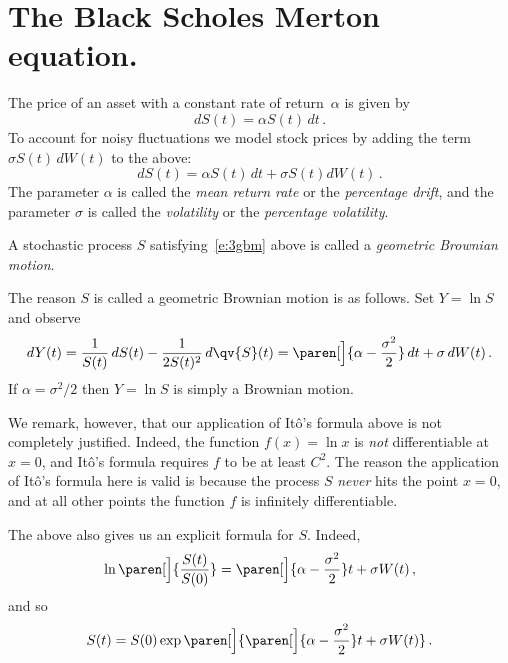 \section{The Black Scholes Merton equation.}

The price of an asset with a constant rate of return~$\alpha$ is given by
\begin{equation*}
  dS(t) = \alpha S(t) \, dt\,.
\end{equation*}
To account for noisy fluctuations we model stock prices by adding the term $\sigma S(t) \, dW(t)$ to the above:
\begin{equation}\label{e:3gbm}
  dS(t) = \alpha S(t) \, dt + \sigma S(t) dW(t)\,.
\end{equation}
The parameter $\alpha$ is called the \emph{mean return rate} or the \emph{percentage drift}, and the parameter $\sigma$ is called the \emph{volatility} or the \emph{percentage volatility}.

\begin{definition}
  A stochastic process $S$ satisfying~\eqref{e:3gbm} above is called a \emph{geometric Brownian motion}.
\end{definition}

The reason $S$ is called a geometric Brownian motion is as follows.
Set $Y = \ln S$ and observe
\begin{equation*}
  dY(t) = \frac{1}{S(t)} \, dS(t) - \frac{1}{2 S(t)^2} \, d\qv{S}(t)
    = \paren[\Big]{\alpha - \frac{\sigma^2}{2}} \, dt + \sigma \, dW(t)\,.
\end{equation*}
If $\alpha = \sigma^2/2$ then $Y = \ln S$ is simply a Brownian motion.

We remark, however, that our application of It\^o's formula above is not completely justified.
Indeed, the function $f(x) = \ln x$ is \emph{not} differentiable at $x = 0$, and It\^o's formula requires $f$ to be at least $C^2$.
The reason the application of It\^o's formula here is valid is because the process $S$ \emph{never} hits the point $x = 0$, and at all other points the function $f$ is infinitely differentiable.

The above also gives us an explicit formula for $S$.
Indeed,
\begin{equation*}
  \ln\paren[\Big]{ \frac{S(t)}{S(0)} }
    = \paren[\Big]{\alpha - \frac{\sigma^2}{2}} t + \sigma W(t)\,,
\end{equation*}
and so
\begin{equation}\label{e:3gbmFor}
  S(t) = S(0) \exp\paren[\Big]{
    \paren[\Big]{\alpha - \frac{\sigma^2}{2}} t + \sigma W(t)
  }\,.
\end{equation}

